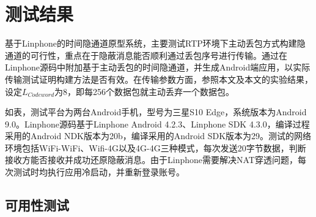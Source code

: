 \section{测试结果}
\label{chap:linphone:result}

基于Linphone的时间隐通道原型系统，主要测试RTP环境下主动丢包方式构建隐通道的可行性，重点在于隐蔽消息能否顺利通过丢包序号进行传输。通过在Linphone源码中附加基于主动丢包的时间隐通道，并生成Android端应用，以实际传输测试证明构建方法是否有效。在传输参数方面，参照本文及本文的实验结果，设定$L_{Codeword}$为8，即每256个数据包就主动丢弃一个数据包。


如表，测试平台为两台Android手机，型号为三星S10 Edge，系统版本为Android 9.0。Linphone源码基于Linphone Android 4.2.3、Linphone SDK 4.3.0，编译过程采用的Android NDK版本为20b，编译采用的Android SDK版本为29。测试的网络环境包括WiFi-WiFi、Wifi-4G以及4G-4G三种模式，每次发送20字节数据，判断接收方能否接收并成功还原隐蔽消息。由于Linphone需要解决NAT穿透问题，每次测试时均执行应用冷启动，并重新登录账号。

\subsection{可用性测试}
\label{chap:linphone:result:availablity}

